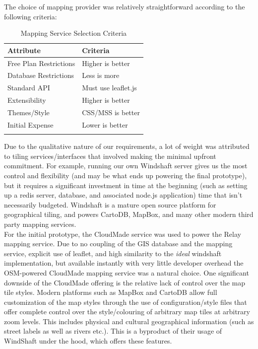 \documentclass{article}
\begin{document}
The choice of mapping provider was relatively straightforward according to the following criteria:\\

\begin{longtable}{|l|l|} \hline
    \textbf{Attribute}              & \textbf{Criteria}            \\ \hline
    Free Plan Restrictions & Higher is better    \\ \hline
    Database Restrictions  & Less is more        \\ \hline
    Standard API           & Must use leaflet.js \\ \hline
    Extensibility          & Higher is better    \\ \hline
    Themes/Style           & CSS/MSS is better   \\ \hline
	Initial Expense        & Lower is better	 \\ \hline
     \caption{Mapping Service Selection Criteria}
     \label{tab:Map_Selection_Criteria}
\end{longtable}

Due to the qualitative nature of our requirements, a lot of weight was attributed to tiling services/interfaces that involved making the minimal upfront commitment.
For example, running our own Windshaft server gives us the most control and flexibility (and may be what ends up powering the final prototype), but it requires a significant investment in time at the beginning (such as setting up a redis server, database, and associated node.js application) time that isn't necessarily budgeted.
Windshaft is a mature open source platform for geographical tiling, and powers CartoDB, MapBox, and many other modern third party mapping services.\\

For the initial prototype, the CloudMade service was used to power the Relay mapping service.
Due to no coupling of the GIS database and the mapping service, explicit use of leaflet, and high similarity to the \emph{ideal} windshaft implementation, but available instantly with very little developer overhead the OSM-powered CloudMade mapping service was a natural choice.
One significant downside of the CloudMade offering is the relative lack of control over the map tile styles.
Modern platforms such as MapBox and CartoDB allow full customization of the map styles through the use of configuration/style files that offer complete control over the style/colouring of arbitrary map tiles at arbitrary zoom levels.
This includes physical and cultural geographical information (such as street labels as well as rivers etc.).
This is a byproduct of their usage of WindShaft under the hood, which offers these features.\\
\end{document}

